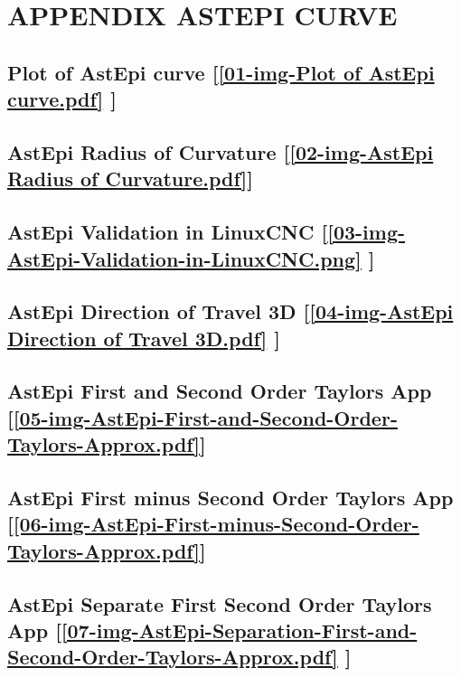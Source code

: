 \section{\textbf{APPENDIX ASTEPI CURVE}} \label{APPENDIX ASTEPI CURVE}


\subsection       {Plot of AstEpi curve
	[\ref  {01-img-Plot of AstEpi curve.pdf} ] }
\label{ssec-01-img-Plot of AstEpi curve.pdf}

\subsection       {AstEpi Radius of Curvature
	[\ref      {02-img-AstEpi Radius of Curvature.pdf}] }
\label{ssec-02-img-AstEpi Radius of Curvature.pdf}

\subsection       {AstEpi Validation in LinuxCNC
	[\ref      {03-img-AstEpi-Validation-in-LinuxCNC.png} ] }
\label{ssec-03-img-AstEpi-Validation-in-LinuxCNC.png}

\subsection     {AstEpi Direction of Travel 3D
	[\ref      {04-img-AstEpi Direction of Travel 3D.pdf} ] }
\label{ssec-04-img-AstEpi Direction of Travel 3D.pdf}

\subsection       {AstEpi First and Second Order Taylors App
	[\ref      {05-img-AstEpi-First-and-Second-Order-Taylors-Approx.pdf}] }
\label{ssec-05-img-AstEpi-First-and-Second-Order-Taylors-Approx.pdf}

\subsection       {AstEpi First minus Second Order Taylors App
	[\ref      {06-img-AstEpi-First-minus-Second-Order-Taylors-Approx.pdf}] }
\label{ssec-06-img-AstEpi-First-minus-Second-Order-Taylors-Approx.pdf}

\subsection       {AstEpi Separate First Second Order Taylors App
	[\ref      {07-img-AstEpi-Separation-First-and-Second-Order-Taylors-Approx.pdf} ] }
\label{ssec-07-img-AstEpi-Separation-First-and-Second-Order-Taylors-Approx.pdf}

